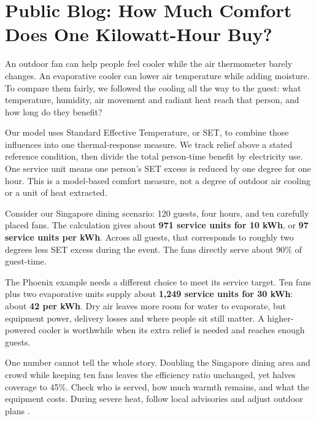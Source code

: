 \clearpage
\section*{Public Blog: How Much Comfort Does One Kilowatt-Hour Buy?}

An outdoor fan can help people feel cooler while the air thermometer barely changes. An evaporative cooler can lower air temperature while adding moisture. To compare them fairly, we followed the cooling all the way to the guest: what temperature, humidity, air movement and radiant heat reach that person, and how long do they benefit?

Our model uses Standard Effective Temperature, or SET, to combine those influences into one thermal-response measure. We track relief above a stated reference condition, then divide the total person-time benefit by electricity use. One service unit means one person's SET excess is reduced by one degree for one hour. This is a model-based comfort measure, not a degree of outdoor air cooling or a unit of heat extracted.

Consider our Singapore dining scenario: 120 guests, four hours, and ten carefully placed fans. The calculation gives about \textbf{971 service units for 10 kWh}, or \textbf{97 service units per kWh}. Across all guests, that corresponds to roughly two degrees less SET excess during the event. The fans directly serve about 90\% of guest-time.

The Phoenix example needs a different choice to meet its service target. Ten fans plus two evaporative units supply about \textbf{1,249 service units for 30 kWh}: about \textbf{42 per kWh}. Dry air leaves more room for water to evaporate, but equipment power, delivery losses and where people sit still matter. A higher-powered cooler is worthwhile when its extra relief is needed and reaches enough guests.

One number cannot tell the whole story. Doubling the Singapore dining area and crowd while keeping ten fans leaves the efficiency ratio unchanged, yet halves coverage to 45\%. Check who is served, how much warmth remains, and what the equipment costs. During severe heat, follow local advisories and adjust outdoor plans \cite{nws-heat,nea-heat}.


